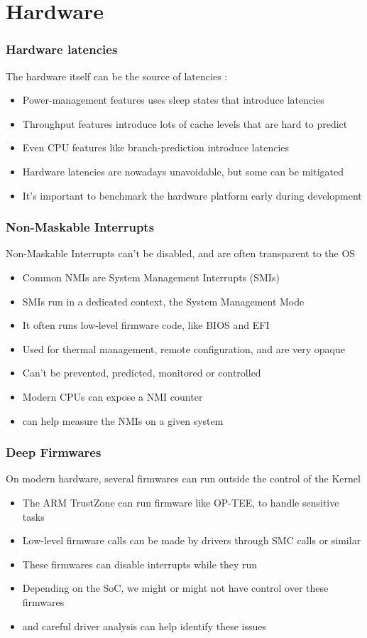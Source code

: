 \section{Hardware}

\begin{frame}
	\frametitle{Hardware latencies}
	The hardware itself can be the source of latencies :
	\begin{itemize}
		\item Power-management features uses sleep states that introduce latencies
		\item Throughput features introduce lots of cache levels that are hard to predict
		\item Even CPU features like branch-prediction introduce latencies
		\item Hardware latencies are nowadays unavoidable, but some can be mitigated
		\item It's important to benchmark the hardware platform early during development
	\end{itemize}
\end{frame}

\begin{frame}
	\frametitle{Non-Maskable Interrupts}
	Non-Maskable Interrupts can't be disabled, and are often transparent to the OS
	\begin{itemize}
		\item Common NMIs are System Management Interrupts (SMIs)
		\item SMIs run in a dedicated context, the System Management Mode
		\item It often runs low-level firmware code, like BIOS and EFI
		\item Used for thermal management, remote configuration, and are very opaque
		\item Can't be prevented, predicted, monitored or controlled
		\item Modern CPUs can expose a NMI counter
		\item {} can help measure the NMIs on a given system
	\end{itemize}
\end{frame}

\begin{frame}
	\frametitle{Deep Firmwares}
	On modern hardware, several firmwares can run outside the control of the Kernel
	\begin{itemize}
		\item The ARM TrustZone can run firmware like OP-TEE, to handle sensitive tasks
		\item Low-level firmware calls can be made by drivers through SMC calls or similar
		\item These firmwares can disable interrupts while they run
		\item Depending on the SoC, we might or might not have control over these firmwares
		\item {} and careful driver analysis can help identify these issues
	\end{itemize}
\end{frame}

